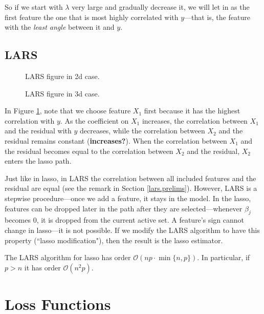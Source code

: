 So if we start with \(\lambda\) very large and gradually decrease it, we will let in as the first feature the one that is most highly correlated with \(y\)---that is, the feature with the \textit{least angle} between it and \(y\).


\subsection{LARS}

\begin{figure}
\caption{\label{fig:lars_2d} LARS figure in 2d case.}
\end{figure}

\begin{figure}
\caption{\label{fig:lars_3d} LARS figure in 3d case.}
\end{figure}

In Figure \ref{fig:lars_2d}, note that we choose feature \(X_1\) first because it has the highest correlation with \(y\). As the coefficient on \(X_1\) increases, the correlation between \(X_1\) and the residual with \(y\) decreases, while the correlation between \(X_2\) and the residual remains constant (\textbf{increases?}). When the correlation between \(X_1\) and the residual becomes equal to the correlation between \(X_2\) and the residual, \(X_2\) enters the lasso path.

\begin{remark} Just like in lasso, in LARS the correlation between all included features and the residual are equal (see the remark in Section \ref{lars.prelims}). However, LARS is a stepwise procedure---once we add a feature, it stays in the model. In the lasso, features can be dropped later in the path after they are selected---whenever \(\beta_j\) becomes 0, it is dropped from the current active set. A feature's sign cannot change in lasso---it is not possible. If we modify the LARS algorithm to have this property (``lasso modification"), then the result is the lasso estimator.

\end{remark}

The LARS algorithm for lasso has order \(\mathcal{O}(np \cdot \min \{n, p\})\). In particular, if \(p > n\) it has order \(\mathcal{O}(n^2p)\).


\section{Loss Functions}\label{linreg.sec.loss.fxs}

